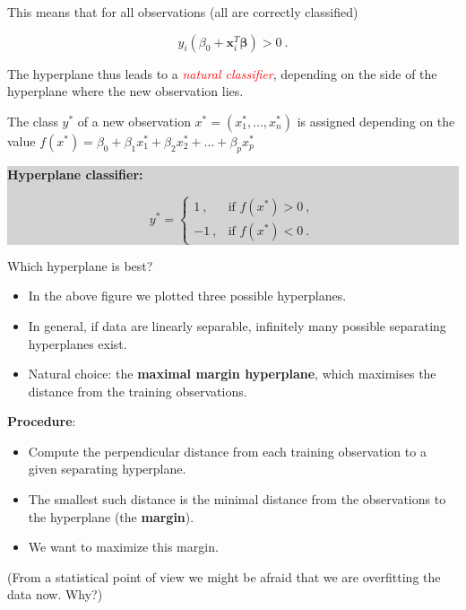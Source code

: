 \documentclass[10pt,ignorenonframetext,]{beamer}
\begin{document}
\begin{frame}

This means that for all observations (all are correctly classified)

\[y_i (\beta_0+{\boldsymbol x}_i^T {\boldsymbol \beta})>0 \ .\]

\vspace{2mm} The hyperplane thus leads to a
\emph{\textcolor{red}{natural classifier}}, depending on the side of the
hyperplane where the new observation lies.

The class \(y^*\) of a new observation \(x^*=(x_1^*,...,x_n^*)\) is
assigned depending on the value
\(f(x^*)=\beta_0+\beta_1 x_1^* + \beta_2 x_{2}^*+...+\beta_p x_{p}^*\)

\begin{center}
\colorbox{lightgray}{\begin{minipage}{8cm}
{\bf Hyperplane classifier:}

$$y^* = \left\{ \begin{array}{ll}
1 \ , & \text{if } f(x^*) >0 \ ,\\
-1 \ , & \text{if } f(x^*) < 0 \ .
\end{array}\right.$$
 \end{minipage}}
\end{center}

\end{frame}

\begin{frame}

\begin{block}{Which hyperplane is best?}

\vspace{2mm}

\begin{itemize}
\item
  In the above figure we plotted three possible hyperplanes.
\item
  In general, if data are linearly separable, infinitely many possible
  separating hyperplanes exist.
\item
  Natural choice: the \textbf{maximal margin hyperplane}, which
  maximises the distance from the training observations.
\end{itemize}

\vspace{2mm}

\textbf{Procedure}:

\begin{itemize}
\item
  Compute the perpendicular distance from each training observation to a
  given separating hyperplane.
\item
  The smallest such distance is the minimal distance from the
  observations to the hyperplane (the \textbf{margin}).
\item
  We want to maximize this margin.
\end{itemize}

(From a statistical point of view we might be afraid that we are
overfitting the data now. Why?)

\end{block}

\end{frame}
\end{document}
